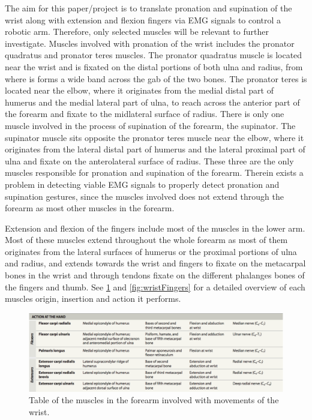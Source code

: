 The aim for this paper/project is to translate pronation and supination of the wrist along with extension and flexion fingers via EMG signals to control a robotic arm. Therefore, only selected muscles will be relevant to further investigate. 
Muscles involved with pronation of the wrist includes the pronator quadratus and pronator teres muscles. The pronator quadratus muscle is located near the wrist and is fixated on the distal portions of both ulna and radius, from where is forms a wide band across the gab of the two bones. The pronator teres is located near the elbow, where it originates  from the medial distal part of humerus and the medial lateral part of ulna, to reach across the anterior part of the forearm and fixate to the midlateral surface of radius. 
There is only one muscle involved in the process of supination of the forearm, the supinator. The supinator muscle sits opposite the pronator teres muscle near the elbow, where it originates from the lateral distal part of humerus and the lateral proximal part of ulna and fixate on the anterolateral surface of radius. 
These three are the only muscles responsible for pronation and supination of the forearm. Therein exists a problem in detecting viable EMG signals to properly detect pronation and supination gestures, since the muscles involved does not extend through the forearm as most other muscles in the forearm. 

Extension and flexion of the fingers include most of the muscles in the lower arm. Most of these muscles extend throughout the whole forearm as most of them originates from the lateral surfaces of humerus or the proximal portions of ulna and radius, and extends towards the wrist and fingers to fixate on the metacarpal bones in the wrist and through tendons fixate on the different phalanges bones of the fingers and thumb. See \ref{fig:wrist} and \ref{fig:wristFingers} for a detailed overview of each muscles origin, insertion and action it performs. 

\begin{figure}[H]
	\includegraphics[width=.4\textwidth]{figures/Anatomy/wrist}  %
	\caption{Table of the muscles in the forearm involved with movements of the wrist. \cite{martini}}
	\label{fig:wrist}  %
\end{figure}

